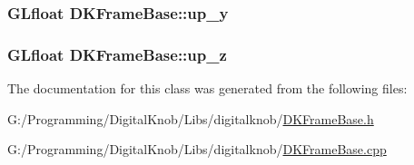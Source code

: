 \hypertarget{class_d_k_frame_base_abb7dacc641c090770a862eccc74a47d1}{
\subsubsection[{up\-\_\-y}]{\setlength{\rightskip}{0pt plus 5cm}G\-Lfloat D\-K\-Frame\-Base\-::up\-\_\-y}}\label{class_d_k_frame_base_abb7dacc641c090770a862eccc74a47d1}
\hypertarget{class_d_k_frame_base_a1c567a462b7fd9e10f23ff1ea5166ff0}{
\subsubsection[{up\-\_\-z}]{\setlength{\rightskip}{0pt plus 5cm}G\-Lfloat D\-K\-Frame\-Base\-::up\-\_\-z}}\label{class_d_k_frame_base_a1c567a462b7fd9e10f23ff1ea5166ff0}


The documentation for this class was generated from the following files\-:\begin{DoxyCompactItemize}
\item 
G\-:/\-Programming/\-Digital\-Knob/\-Libs/digitalknob/\hyperlink{_d_k_frame_base_8h}{D\-K\-Frame\-Base.\-h}\item 
G\-:/\-Programming/\-Digital\-Knob/\-Libs/digitalknob/\hyperlink{_d_k_frame_base_8cpp}{D\-K\-Frame\-Base.\-cpp}\end{DoxyCompactItemize}
